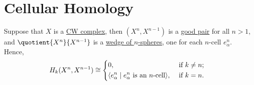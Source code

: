 \section{Cellular Homology}
Suppose that \(X\) is a \hyperref[def:CW-Complex]{CW complex}, then \((X^n, X^{n - 1})\) is a \hyperref[def:good-pair]{good pair} for all \(n > 1\), and
\(\quotient{X^n}{X^{n - 1}}\) is a \hyperref[CW-complex-wedge-sum]{wedge of \(n\)-spheres}, one for each \(n\)-cell \(e^n_\alpha\). Hence,
\[
	H_k(X^n, X^{n - 1}) \cong \begin{dcases}
		0,                                                                    & \text{ if } k\neq n ; \\
		\langle e_\alpha^n \mid  e_\alpha^n \text{ is an \(n\)-cell} \rangle, & \text{ if } k = n .
	\end{dcases}
\]

